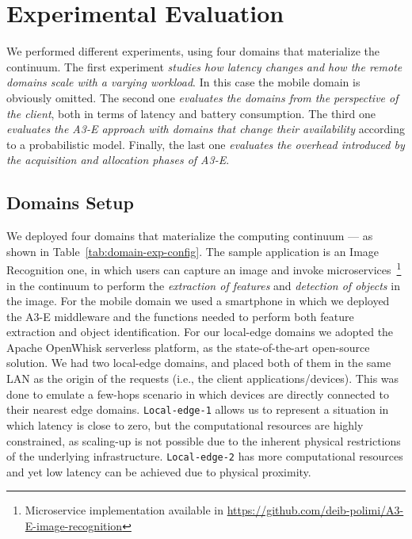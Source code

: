 \section{Experimental Evaluation}\label{sec:evaluation}

We performed different experiments, using four domains that materialize the continuum. The first experiment \emph{studies how latency changes and how the remote domains scale with a varying workload}. In this case the mobile domain is obviously omitted. The second one \emph{evaluates the domains from the perspective of the client}, both in terms of latency and battery consumption. The third one \emph{evaluates the A3-E approach with domains that change their availability} according to a probabilistic model.
Finally, the last one \emph{evaluates the overhead introduced by the acquisition and allocation phases of A3-E}.

\subsection{Domains Setup}


We deployed four domains that materialize the computing continuum --- as shown in Table~\ref{tab:domain-exp-config}. The sample application is an Image Recognition one, in which users can capture an image and invoke microservices~\footnote{Microservice implementation available in \url{https://github.com/deib-polimi/A3-E-image-recognition}} in the continuum to perform the \textit{extraction of features} and \textit{detection of objects} in the image. For the mobile domain we used a smartphone in which we deployed the A3-E middleware and the functions needed to perform both feature extraction and object identification. For our local-edge domains we adopted the Apache OpenWhisk serverless platform, as the state-of-the-art open-source solution. We had two local-edge domains, and placed both of them in the same LAN as the origin of the requests (i.e., the client applications/devices). This was done to emulate a few-hops scenario in which devices are directly connected to their nearest edge domains. \texttt{Local-edge-1} allows us to represent a situation in which latency is close to zero, but the computational resources are highly constrained, as scaling-up is not possible due to the inherent physical restrictions of the underlying infrastructure. \texttt{Local-edge-2} has more computational resources and yet low latency can be achieved due to physical proximity.

